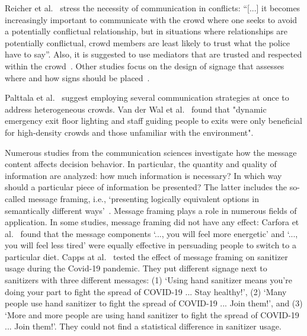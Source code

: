 Reicher et al.~\cite[p.16]{reicher-2004-life} stress the necessity of communication in conflicts: \enquote{[...] it becomes increasingly important to communicate with the crowd where one seeks to avoid a potentially conflictual relationship, but in situations where relationships are potentially conflictual, crowd members are least likely to trust what the police have to say}. 
Also, it is suggested to use mediators that are trusted and respected within the crowd~\cite{reicher-2004-life}. 
Other studies focus on the design of signage that assesses where and how signs should be placed~\cite{farr-2012-life}. 

Palttala et al.~\cite{palttala-2012-cdyn} suggest employing several communication strategies at once to address heterogeneous crowds.
Van der Wal et al.~\cite{wal-2021-life} found that "dynamic emergency exit floor lighting and staff guiding people to exits were only beneficial for high-density crowds and those unfamiliar with the environment". 
%

Numerous studies from the communication sciences investigate how the message content affects decision behavior. In particular, the quantity and quality of information are analyzed: how much information is necessary? In which way should a particular piece of information be presented? The latter includes the so-called message framing, i.e., `presenting logically equivalent options in semantically different ways'~\cite{krishnamurthy-2001-life}.
%
Message framing plays a role in numerous fields of application. 
In some studies, message framing did not have any effect: Carfora et al.~\cite{carfora-2022b-life} found that the message components `..., you will feel more energetic' and  `..., you will feel less tired' were equally effective in persuading people to switch to a particular diet. Capps at al.~\cite{capps-2022-life} tested the effect of message framing on sanitizer usage during the Covid-19 pandemic. They put different signage next to sanitizers with three different messages: (1) `Using hand sanitizer means you're doing your part to fight the spread of COVID-19 ... Stay healthy!', (2) `Many people use hand sanitizer to fight the spread of COVID-19 ... Join them!', and (3) `More and more people are using hand sanitizer to fight the spread of COVID-19 ... Join them!'. They could not find a statistical difference in sanitizer usage. 

